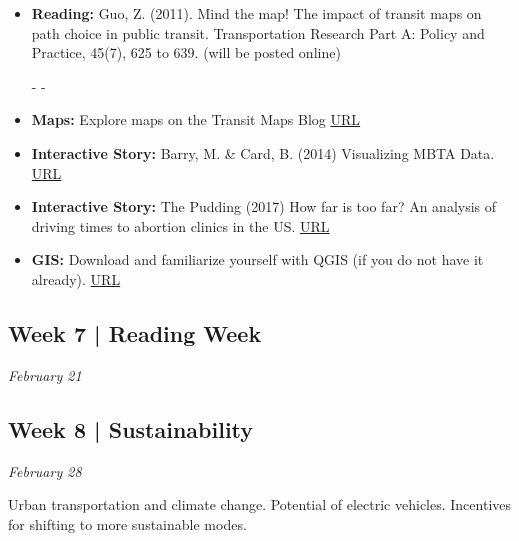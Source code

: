 \documentclass[11pt]{article}
\begin{document}
	
	\begin{itemize}
		
		\item \textbf{Reading:} Guo, Z. (2011). Mind the map! The impact of transit maps on path choice in public transit. Transportation Research Part A: Policy and Practice, 45(7), 625 to 639. (will be posted online)
		
		- -
		
		\item \textbf{Maps:} Explore maps on the Transit Maps Blog \href{http://transitmap.net/}{URL}
		
		\item \textbf{Interactive Story:} Barry, M. \& Card, B. (2014) Visualizing MBTA Data. \href{http://mbtaviz.github.io/}{URL}
		
		\item \textbf{Interactive Story:} The Pudding (2017) How far is too far? An analysis of driving times to abortion clinics in the US. \href{https://pudding.cool/2017/09/clinics/}{URL}
		
		\item \textbf{GIS:} Download and familiarize yourself with QGIS (if you do not have it already). \href{https://www.qgis.org/en/site/index.html}{URL} 
		
		
	\end{itemize}
	
	
	
	
	
	\subsection*{Week 7 | Reading Week}
	
	\textit{February 21}
	
	
	
	\subsection*{Week 8 | Sustainability}
	
	\textit{February 28}
	
	Urban transportation and climate change. Potential of electric vehicles. Incentives for shifting to more sustainable modes.
	
	
\end{document}
